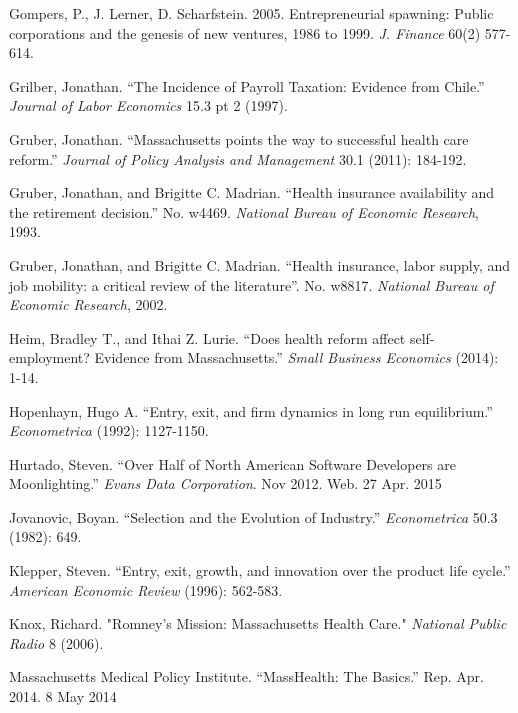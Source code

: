 \documentclass[12pt]{article}
\begin{document}
\begin{thebibliography}{99}
Gompers, P., J. Lerner, D. Scharfstein. 2005. Entrepreneurial spawning: Public corporations and the genesis of new ventures, 1986 to 1999. \emph{J. Finance} 60(2) 577-614.

Grilber, Jonathan. ``The Incidence of Payroll Taxation: Evidence from Chile.'' \emph{Journal of Labor Economics} 15.3 pt 2 (1997).


Gruber, Jonathan. ``Massachusetts points the way to successful health care reform.'' \emph{Journal of Policy Analysis and Management} 30.1 (2011): 184-192.
        
Gruber, Jonathan, and Brigitte C. Madrian. ``Health insurance availability and the retirement decision.'' No. w4469. \emph{National Bureau of Economic Research}, 1993.
        
Gruber, Jonathan, and Brigitte C. Madrian. ``Health insurance, labor supply, and job mobility: a critical review of the literature''. No. w8817. \emph{National Bureau of Economic Research}, 2002.      
        
Heim, Bradley T., and Ithai Z. Lurie. ``Does health reform affect self-employment? Evidence from Massachusetts.'' \emph{Small Business Economics} (2014): 1-14.

Hopenhayn, Hugo A. ``Entry, exit, and firm dynamics in long run equilibrium.'' \emph{Econometrica} (1992): 1127-1150.

Hurtado, Steven. ``Over Half of North American Software Developers are Moonlighting.'' \emph{Evans Data Corporation}. Nov 2012. Web. 27 Apr. 2015

Jovanovic, Boyan. ``Selection and the Evolution of Industry.'' \emph{Econometrica} 50.3 (1982): 649.

Klepper, Steven. ``Entry, exit, growth, and innovation over the product life cycle.'' \emph{American Economic Review} (1996): 562-583.

Knox, Richard. "Romney’s Mission: Massachusetts Health Care." \emph{National Public Radio} 8 (2006).

Massachusetts Medical Policy Institute. ``MassHealth: The Basics.'' Rep. Apr. 2014. 8 May 2014 


\begin{comment}




\end{comment}
\end{thebibliography}
\end{document}
